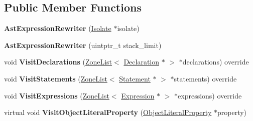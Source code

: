 \subsection*{Public Member Functions}
\begin{DoxyCompactItemize}
\item 
{\bfseries Ast\+Expression\+Rewriter} (\hyperlink{classv8_1_1internal_1_1_isolate}{Isolate} $\ast$isolate)\hypertarget{classv8_1_1internal_1_1_ast_expression_rewriter_a05d53eb8c0cc5e7c7403be4948b1fc3d}{}\label{classv8_1_1internal_1_1_ast_expression_rewriter_a05d53eb8c0cc5e7c7403be4948b1fc3d}

\item 
{\bfseries Ast\+Expression\+Rewriter} (uintptr\+\_\+t stack\+\_\+limit)\hypertarget{classv8_1_1internal_1_1_ast_expression_rewriter_aa23a8e6891c43a6b3eaac1d96383b674}{}\label{classv8_1_1internal_1_1_ast_expression_rewriter_aa23a8e6891c43a6b3eaac1d96383b674}

\item 
void {\bfseries Visit\+Declarations} (\hyperlink{classv8_1_1internal_1_1_zone_list}{Zone\+List}$<$ \hyperlink{classv8_1_1internal_1_1_declaration}{Declaration} $\ast$ $>$ $\ast$declarations) override\hypertarget{classv8_1_1internal_1_1_ast_expression_rewriter_abf4fd7c8f9c6535b28734b0a34956844}{}\label{classv8_1_1internal_1_1_ast_expression_rewriter_abf4fd7c8f9c6535b28734b0a34956844}

\item 
void {\bfseries Visit\+Statements} (\hyperlink{classv8_1_1internal_1_1_zone_list}{Zone\+List}$<$ \hyperlink{classv8_1_1internal_1_1_statement}{Statement} $\ast$ $>$ $\ast$statements) override\hypertarget{classv8_1_1internal_1_1_ast_expression_rewriter_a8d26860d6ebefcfbf3e13b80ff8b00f4}{}\label{classv8_1_1internal_1_1_ast_expression_rewriter_a8d26860d6ebefcfbf3e13b80ff8b00f4}

\item 
void {\bfseries Visit\+Expressions} (\hyperlink{classv8_1_1internal_1_1_zone_list}{Zone\+List}$<$ \hyperlink{classv8_1_1internal_1_1_expression}{Expression} $\ast$ $>$ $\ast$expressions) override\hypertarget{classv8_1_1internal_1_1_ast_expression_rewriter_a14e1d97eadcf74e011f99f2c46ca4e0c}{}\label{classv8_1_1internal_1_1_ast_expression_rewriter_a14e1d97eadcf74e011f99f2c46ca4e0c}

\item 
virtual void {\bfseries Visit\+Object\+Literal\+Property} (\hyperlink{classv8_1_1internal_1_1_object_literal_property}{Object\+Literal\+Property} $\ast$property)\hypertarget{classv8_1_1internal_1_1_ast_expression_rewriter_aa883c659ee21e63a205370c486dda222}{}\label{classv8_1_1internal_1_1_ast_expression_rewriter_aa883c659ee21e63a205370c486dda222}

\end{DoxyCompactItemize}
